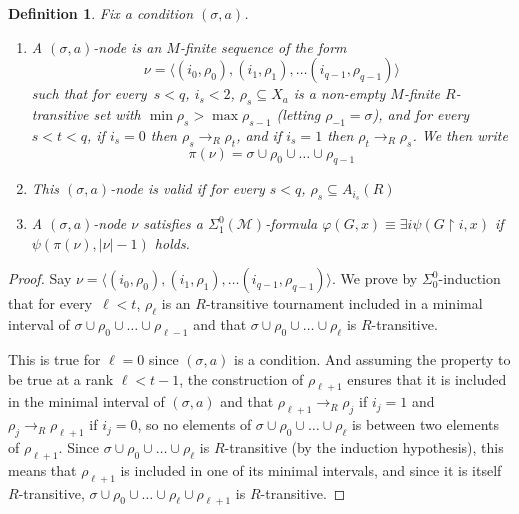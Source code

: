 \documentclass{article}
\numberwithin{theorem}{section}
\newtheorem{lemma}[theorem]{Lemma}
\newtheorem{definition}[theorem]{Definition}
\newcommand{\M}{\mathcal{M}}
\newcommand{\uh}[0]{{\upharpoonright}}
\begin{document}
\begin{definition}
Fix a condition $(\sigma, a)$.
\begin{enumerate}
    \item[(1)] A \emph{$(\sigma, a)$-node} is an $M$-finite sequence of the form
$$\nu = \langle (i_0, \rho_0), (i_1, \rho_1), \dots (i_{q-1}, \rho_{q-1}) \rangle$$ such that for every~$s < q$, $i_s < 2$, $\rho_s \subseteq X_a$ is a non-empty $M$-finite $R$-transitive set with $\min \rho_s > \max \rho_{s-1}$ (letting $\rho_{-1} = \sigma$), and for every~$s < t < q$, if $i_s = 0$ then $\rho_s \to_R \rho_t$, and if $i_s = 1$ then $\rho_t \to_R \rho_s$.
We then write $$\pi(\nu) = \sigma \cup \rho_0 \cup \dots \cup \rho_{q-1}$$
    \item[(2)] This $(\sigma, a)$-node is \emph{valid} if for every $s < q$, $\rho_s \subseteq A_{i_s}(R)$
    \item[(3)] A $(\sigma, a)$-node $\nu$ \emph{satisfies} a $\Sigma^0_1(\M)$-formula $\varphi(G, x) \equiv \exists i \psi(G \uh i, x)$  if $\psi(\pi(\nu), |\nu|-1)$ holds.
\end{enumerate}
\end{definition}


\begin{proof}
Say $\nu = \langle (i_0, \rho_0), (i_1, \rho_1), \dots (i_{q-1}, \rho_{q-1}) \rangle$.
We prove by $\Sigma^0_0$-induction that for every~$\ell < t$, $\rho_\ell$ is an $R$-transitive tournament included in a minimal interval of $\sigma \cup \rho_0 \cup \dots \cup \rho_{\ell-1}$ and that $\sigma \cup \rho_0 \cup \dots \cup \rho_{\ell}$ is $R$-transitive.

This is true for $\ell = 0$ since $(\sigma, a)$ is a condition. And assuming the property to be true at a rank $\ell < t-1$, the construction of $\rho_{\ell +1}$ ensures that it is included in the minimal interval of $(\sigma,a)$ and that $\rho_{\ell + 1} \to_R \rho_{j}$ if $i_j = 1$ and $\rho_j \to_R \rho_{\ell + 1}$ if $i_j = 0$, so no elements of $\sigma \cup \rho_0 \cup \dots \cup \rho_{\ell}$ is between two elements of $\rho_{\ell+1}$. Since $\sigma \cup \rho_0 \cup \dots \cup \rho_{\ell}$ is $R$-transitive (by the induction hypothesis), this means that $\rho_{\ell +1}$ is included in one of its minimal intervals, and since it is itself $R$-transitive, $\sigma \cup \rho_0 \cup \dots \cup \rho_{\ell} \cup \rho_{\ell +1}$ is $R$-transitive.
\end{proof}
\end{document}
